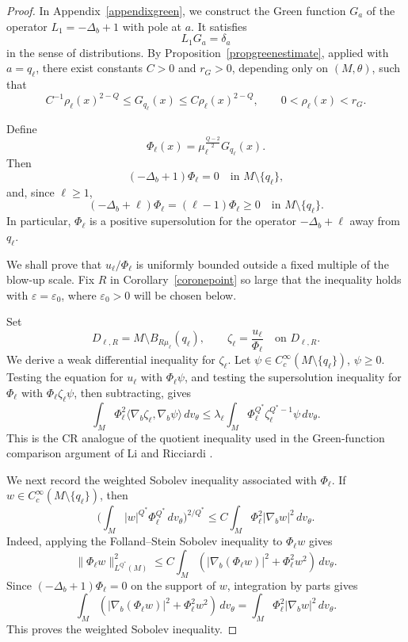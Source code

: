 \documentclass[11pt]{article}
\numberwithin{equation}{section}
\numberwithin{equation}{section}
\begin{document}
	\begin{proof}
		In Appendix~\ref{appendixgreen}, we construct the Green function \(G_a\) of the operator \(L_1=-\Delta_b+1\) with pole at \(a\).  It satisfies
		\[
		L_1G_a=\delta_a
		\]
		in the sense of distributions. By Proposition~\ref{propgreenestimate}, applied with \(a=q_\ell\), there exist constants \(C>0\) and \(r_G>0\), depending only on \((M,\theta)\), such that
		\[
		C^{-1}\rho_\ell(x)^{2-Q} \le G_{q_\ell}(x) \le C\rho_\ell(x)^{2-Q}, \qquad 0<\rho_\ell(x)<r_G .
		\]
		
		Define
		\[
		\Phi_\ell(x)=\mu_\ell^{\frac{Q-2}{2}}G_{q_\ell}(x).
		\]
		Then
		\[
		(-\Delta_b+1)\Phi_\ell=0\quad\text{in }M\setminus\{q_\ell\},
		\]
		and, since \(\ell\ge1\),
		\[
		(-\Delta_b+\ell)\Phi_\ell=(\ell-1)\Phi_\ell\ge0 \quad\text{in }M\setminus\{q_\ell\}.
		\]
		In particular, \(\Phi_\ell\) is a positive supersolution for the operator \(-\Delta_b+\ell\) away from \(q_\ell\).
		
		We shall prove that \(u_\ell/\Phi_\ell\) is uniformly bounded outside a fixed multiple of the blow-up scale. Fix \(R\) in Corollary~\ref{coronepoint} so large that the inequality holds with \(\varepsilon=\varepsilon_0\), where \(\varepsilon_0>0\) will be chosen below.
		
		Set
		\[
		D_{\ell,R}=M\setminus B_{R\mu_\ell}(q_\ell), \qquad \zeta_\ell=\frac{u_\ell}{\Phi_\ell} \quad\text{on }D_{\ell,R}.
		\]
		We derive a weak differential inequality for \(\zeta_\ell\). Let \(\psi\in C_c^\infty(M\setminus\{q_\ell\})\), \(\psi\ge0\). Testing the equation for \(u_\ell\) with \(\Phi_\ell\psi\), and testing the supersolution inequality for \(\Phi_\ell\) with \(\Phi_\ell\zeta_\ell\psi\), then subtracting, gives
		\[
		\int_M \Phi_\ell^2 \langle\nabla_b\zeta_\ell,\nabla_b\psi\rangle\,dv_\theta \le \lambda_\ell \int_M \Phi_\ell^{Q^*}\zeta_\ell^{Q^*-1}\psi\,dv_\theta.
		\]
		This is the CR analogue of the quotient inequality used in the Green-function comparison argument of Li and Ricciardi \cite{LR2003}.
		
		We next record the weighted Sobolev inequality associated with \(\Phi_\ell\). If \(w\in C_c^\infty(M\setminus\{q_\ell\})\), then
		\[
		\Big( \int_M |w|^{Q^*}\Phi_\ell^{Q^*}\,dv_\theta \Big)^{2/Q^*} \le C \int_M \Phi_\ell^2|\nabla_bw|^2\,dv_\theta.
		\]
		Indeed, applying the Folland--Stein Sobolev inequality to \(\Phi_\ell w\) gives
		\[
		\|\Phi_\ell w\|_{L^{Q^*}(M)}^2 \le C\int_M ( |\nabla_b(\Phi_\ell w)|^2+\Phi_\ell^2w^2 )\,dv_\theta.
		\]
		Since \((-\Delta_b+1)\Phi_\ell=0\) on the support of \(w\), integration by parts gives
		\[
		\int_M ( |\nabla_b(\Phi_\ell w)|^2+\Phi_\ell^2w^2)\,dv_\theta = \int_M\Phi_\ell^2|\nabla_bw|^2\,dv_\theta.
		\]
		This proves the weighted Sobolev inequality.
		

\end{proof}
\end{document}
